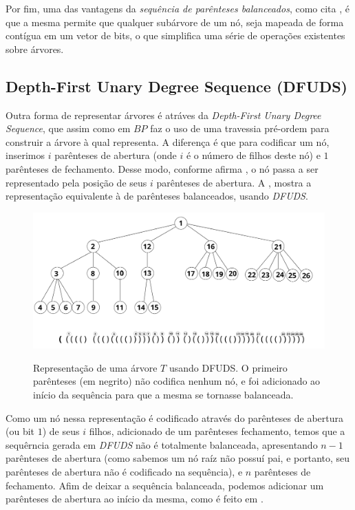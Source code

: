 Por fim, uma das vantagens da \textit{sequência de parênteses balanceados}, como cita \cite{book-compact-data-structures}, é que a mesma permite que qualquer subárvore de um nó, seja mapeada de forma contígua em um vetor de bits, o que simplifica uma série de operações existentes sobre árvores.

\subsection{Depth-First Unary Degree Sequence (DFUDS)}
Outra forma de representar árvores é atráves da \textit{Depth-First Unary Degree Sequence}, que assim como em $BP$ faz o uso de uma travessia pré-ordem para construir a árvore à qual representa.
A diferença é que  para codificar um nó, inserimos $i$ parênteses de abertura (onde $i$ é o número de filhos deste nó) e $1$ parênteses de fechamento.  Desse modo, conforme afirma \cite{paper-succint-trees-in-practice}, o nó passa a ser representado pela posição de seus $i$ parênteses de abertura. A , mostra a representação equivalente à de parênteses balanceados, usando \textit{DFUDS}.
\begin{figure}[!ht]
    \centering
      \caption[Representação de árvores com Sequência de Grau Unário]{Representação de uma árvore $T$ usando DFUDS. O primeiro parênteses (em negrito) não codifica nenhum nó, e foi adicionado ao início da sequência  para que a mesma se tornasse balanceada.}
      \includegraphics[width=\columnwidth]{images/dfuds.png}
      \label{fig:dfuds-representation}
\end{figure}

Como um nó nessa representação é codificado através do parênteses de abertura (ou bit $1$) de seus $i$ filhos, adicionado de um parênteses fechamento, temos que a sequêrncia gerada em \textit{DFUDS} não é totalmente balanceada, apresentando $n-1$ parênteses de abertura (como sabemos um nó raíz não possuí pai, e portanto, seu parênteses de abertura não é codificado na sequência), e $n$ parênteses de fechamento.  Afim de deixar a sequência balanceada, podemos adicionar um parênteses de abertura ao início da mesma, como é feito em \citet{paper-succint-trees-in-practice}.

